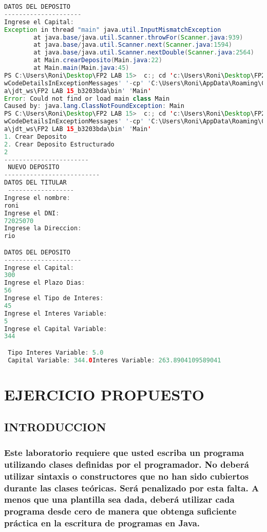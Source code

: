 \documentclass{article}
\begin{document}
\begin{itemize}
\begin{itemize}
\begin{lstlisting}[language=java]
DATOS DEL DEPOSITO
---------------------
Ingrese el Capital:
Exception in thread "main" java.util.InputMismatchException
        at java.base/java.util.Scanner.throwFor(Scanner.java:939)
        at java.base/java.util.Scanner.next(Scanner.java:1594)
        at java.base/java.util.Scanner.nextDouble(Scanner.java:2564)
        at Main.crearDeposito(Main.java:22)
        at Main.main(Main.java:45)
PS C:\Users\Roni\Desktop\FP2 LAB 15>  c:; cd 'c:\Users\Roni\Desktop\FP2 LAB 15'; & 'C:\Program Files\Java\jdk-16.0.1\bin\java.exe' '-XX:+Sho
wCodeDetailsInExceptionMessages' '-cp' 'C:\Users\Roni\AppData\Roaming\Code\User\workspaceStorage\b61e33d765771421b91829ee7ca87311\redhat.jav
a\jdt_ws\FP2 LAB 15_b3203bda\bin' 'Main'
Error: Could not find or load main class Main
Caused by: java.lang.ClassNotFoundException: Main
PS C:\Users\Roni\Desktop\FP2 LAB 15>  c:; cd 'c:\Users\Roni\Desktop\FP2 LAB 15'; & 'C:\Program Files\Java\jdk-16.0.1\bin\java.exe' '-XX:+Sho
wCodeDetailsInExceptionMessages' '-cp' 'C:\Users\Roni\AppData\Roaming\Code\User\workspaceStorage\b61e33d765771421b91829ee7ca87311\redhat.jav
a\jdt_ws\FP2 LAB 15_b3203bda\bin' 'Main'
1. Crear Deposito
2. Crear Deposito Estructurado
2
-----------------------
 NUEVO DEPOSITO
--------------------------
DATOS DEL TITULAR
 ------------------
Ingrese el nombre:
roni
Ingrese el DNI:
72025070
Ingrese la Direccion:
rio

DATOS DEL DEPOSITO
---------------------
Ingrese el Capital:
300
Ingrese el Plazo Dias:
56
Ingrese el Tipo de Interes:
45
Ingrese el Interes Variable:
5
Ingrese el Capital Variable:
344

 Tipo Interes Variable: 5.0
 Capital Variable: 344.0Interes Variable: 263.8904109589041
        \end{lstlisting}
	\end{itemize}
    
    \section{EJERCICIO PROPUESTO}
	\begin{itemize}
        \subsection{INTRODUCCION}
        \subsubsection {Este laboratorio requiere que usted escriba un programa utilizando clases definidas por el programador. No deberá utilizar sintaxis o constructores que no han sido cubiertos durante las clases teóricas. Será penalizado por esta falta. A menos que una plantilla sea dada, deberá utilizar cada programa desde cero de manera que obtenga suficiente práctica en la escritura de programas en Java.}

\end{itemize}
\end{itemize}
\end{document}
